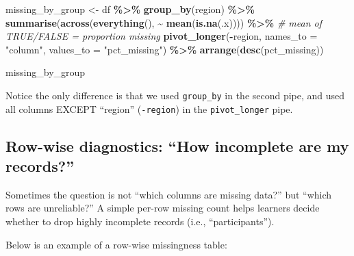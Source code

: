 \documentclass[
  11pt,
]{article}
\newenvironment{Shaded}{\begin{snugshade}}{\end{snugshade}}
\newcommand{\AttributeTok}[1]{\textcolor[rgb]{0.13,0.29,0.53}{#1}}
\newcommand{\CommentTok}[1]{\textcolor[rgb]{0.56,0.35,0.01}{\textit{#1}}}
\newcommand{\FunctionTok}[1]{\textcolor[rgb]{0.13,0.29,0.53}{\textbf{#1}}}
\newcommand{\NormalTok}[1]{#1}
\newcommand{\OtherTok}[1]{\textcolor[rgb]{0.56,0.35,0.01}{#1}}
\newcommand{\SpecialCharTok}[1]{\textcolor[rgb]{0.81,0.36,0.00}{\textbf{#1}}}
\newcommand{\StringTok}[1]{\textcolor[rgb]{0.31,0.60,0.02}{#1}}
\begin{document}
\begin{Shaded}
\begin{Highlighting}[]
\NormalTok{missing\_by\_group }\OtherTok{\textless{}{-}}\NormalTok{ df }\SpecialCharTok{\%\textgreater{}\%}
  \FunctionTok{group\_by}\NormalTok{(region) }\SpecialCharTok{\%\textgreater{}\%}
  \FunctionTok{summarise}\NormalTok{(}\FunctionTok{across}\NormalTok{(}\FunctionTok{everything}\NormalTok{(), }\SpecialCharTok{\textasciitilde{}} \FunctionTok{mean}\NormalTok{(}\FunctionTok{is.na}\NormalTok{(.x)))) }\SpecialCharTok{\%\textgreater{}\%}  \CommentTok{\# mean of TRUE/FALSE = proportion missing}
  \FunctionTok{pivot\_longer}\NormalTok{(}\SpecialCharTok{{-}}\NormalTok{region, }\AttributeTok{names\_to =} \StringTok{"column"}\NormalTok{, }\AttributeTok{values\_to =} \StringTok{"pct\_missing"}\NormalTok{) }\SpecialCharTok{\%\textgreater{}\%}
  \FunctionTok{arrange}\NormalTok{(}\FunctionTok{desc}\NormalTok{(pct\_missing))}

\NormalTok{missing\_by\_group}
\end{Highlighting}
\end{Shaded}

Notice the only difference is that we used \texttt{group\_by} in the
second pipe, and used all columns EXCEPT ``region'' (\texttt{-region})
in the \texttt{pivot\_longer} pipe.

\subsection{Row-wise diagnostics: ``How incomplete are my
records?''}\label{row-wise-diagnostics-how-incomplete-are-my-records}

Sometimes the question is not ``which columns are missing data?'' but
``which rows are unreliable?'' A simple per-row missing count helps
learners decide whether to drop highly incomplete records (i.e.,
``participants'').

Below is an example of a row-wise missingness table:
\end{document}
